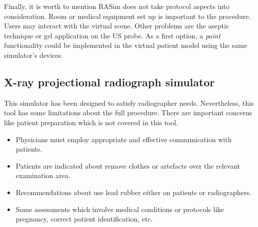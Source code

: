 Finally, it is worth to mention \acs{RASim} does not take protocol aspects into consideration. Room or medical equipment set up is important to the procedure. Users may interact with the virtual scene. Other problems are the aseptic technique or gel application on the \acs{US} probe. As a first option, a \emph{paint} functionality could be implemented in the virtual patient model using the same simulator's devices.


\subsection{X-ray projectional radiograph simulator}


This simulator has been designed to satisfy radiographer needs. Nevertheless, this tool has some limitations about the full procedure. There are important concerns like patient preparation which is not covered in this tool.
\begin{itemize}
 \item Physicians must employ appropriate and effective communication with patients.

 \item Patients are indicated about remove clothes or artefacts over the relevant examination area.

 \item Recommendations about use lead rubber either on patients or radiographers.

 \item Some assessments which involve medical conditions or protocols like pregnancy, correct patient identification, etc.
 
 \end{itemize}

